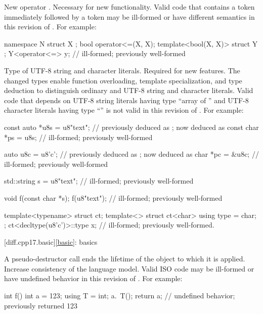 \change
New operator \tcode{<=>}.
\rationale
Necessary for new functionality.
\effect
Valid \CppXVII{} code that contains a \tcode{<=} token
immediately followed by a \tcode{>} token
may be ill-formed or have different semantics in this revision of \Cpp{}.
For example:
\begin{codeblock}
namespace N {
  struct X {};
  bool operator<=(X, X);
  template<bool(X, X)> struct Y {};
  Y<operator<=> y;              // ill-formed; previously well-formed
}
\end{codeblock}

%
\change
Type of UTF-8 string and character literals.
\rationale
Required for new features.
The changed types enable function overloading, template specialization, and
type deduction to distinguish ordinary and UTF-8 string and character literals.
\effect
Valid \CppXVII{} code that depends on
UTF-8 string literals having type ``array of '' and
UTF-8 character literals having type ``''
is not valid in this revision of \Cpp{}.
For example:
\begin{codeblock}
const auto *u8s = u8"text";     //  previously deduced as ; now deduced as 
const char *ps = u8s;           // ill-formed; previously well-formed

auto u8c = u8'c';               //  previously deduced as ; now deduced as 
char *pc = &u8c;                // ill-formed; previously well-formed

std::string s = u8"text";       // ill-formed; previously well-formed

void f(const char *s);
f(u8"text");                    // ill-formed; previously well-formed

template<typename> struct ct;
template<> struct ct<char> {
  using type = char;
};
ct<decltype(u8'c')>::type x;    // ill-formed; previously well-formed.
\end{codeblock}

[diff.cpp17.basic]{\ref{basic}: basics}

\change
A pseudo-destructor call ends the lifetime of
the object to which it is applied.
\rationale
Increase consistency of the language model.
\effect
Valid ISO \CppXVII{} code may be ill-formed or
have undefined behavior in this revision of \Cpp{}.
For example:
\begin{codeblock}
int f() {
  int a = 123;
  using T = int;
  a.~T();
  return a;         // undefined behavior; previously returned 123
}
\end{codeblock}

